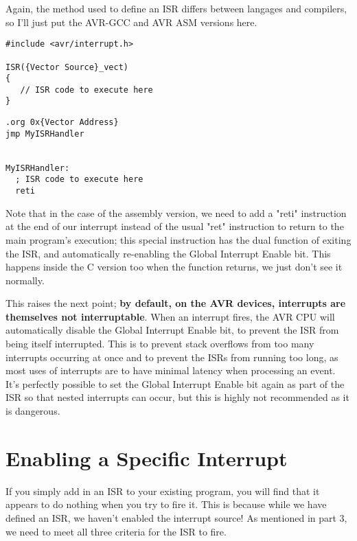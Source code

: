 \documentclass[a4paper,oneside]{book}
\begin{document}
Again, the method used to define an ISR differs between langages and compilers, so I'll just put the AVR-GCC and AVR ASM versions here.

\begin{center}
\begin{lstlisting}
#include <avr/interrupt.h>

ISR({Vector Source}_vect)
{
   // ISR code to execute here
} 
\end{lstlisting}
\end{center}

\begin{center}
\begin{lstlisting}
.org 0x{Vector Address}
jmp MyISRHandler


MyISRHandler:
  ; ISR code to execute here
  reti 
\end{lstlisting}
\end{center}

Note that in the case of the assembly version, we need to add a "reti" instruction at the end of our interrupt instead of the usual "ret" instruction to return to the main program's execution; this special instruction has the dual function of exiting the ISR, and automatically re-enabling the Global Interrupt Enable bit. This happens inside the C version too when the function returns, we just don't see it normally.

This raises the next point; \textbf{by default, on the AVR devices, interrupts are themselves not interruptable}. When an interrupt fires, the AVR CPU will automatically disable the Global Interrupt Enable bit, to prevent the ISR from being itself interrupted. This is to prevent stack overflows from too many interrupts occurring at once and to prevent the ISRs from running too long, as most uses of interrupts are to have minimal latency when processing an event. It's perfectly possible to set the Global Interrupt Enable bit again as part of the ISR so that nested interrupts can occur, but this is highly not recommended as it is dangerous. 


\label{chp:EnableInt}
\chapter{Enabling a Specific Interrupt}

If you simply add in an ISR to your existing program, you will find that it appears to do nothing when you try to fire it. This is because while we have defined an ISR, we haven't enabled the interrupt source! As mentioned in part 3, we need to meet all three criteria for the ISR to fire.
\end{document}
